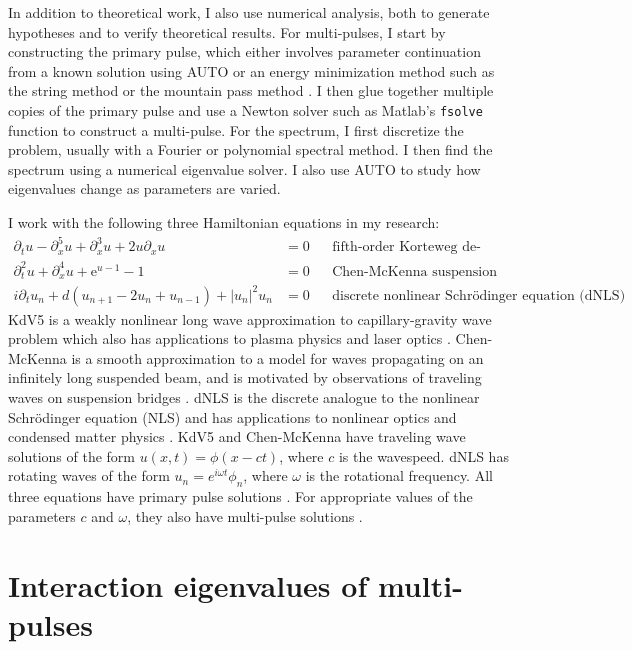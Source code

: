 \documentclass[12pt,reqno,oneside]{article}
\theoremstyle{definition}
\theoremstyle{remark}
\begin{document}
In addition to theoretical work, I also use numerical analysis, both to generate hypotheses and to verify theoretical results. For multi-pulses, I start by constructing the primary pulse, which either involves parameter continuation from a known solution using AUTO or an energy minimization method such as the string method \cite{Chamard2011} or the mountain pass method \cite{Chen1997}. I then glue together multiple copies of the primary pulse and use a Newton solver such as Matlab's \texttt{fsolve} function to construct a multi-pulse. For the spectrum, I first discretize the problem, usually with a Fourier or polynomial spectral method. I then find the spectrum using a numerical eigenvalue solver. I also use AUTO to study how eigenvalues change as parameters are varied.

I work with the following three Hamiltonian equations in my research:
\begin{align*}
\partial_t u - \partial_x^5 u + \partial_x^3 u + 2 u \partial_x u &= 0 && \text{fifth-order Korteweg de-Vries equation (KdV5)} \\
\partial_t^2 u + \partial_x^4 u + \mathrm{e}^{u-1} - 1 &= 0 &&\text{Chen-McKenna suspension bridge equation} \\
i\partial_t u_n + d(u_{n+1} - 2 u_n + u_{n-1}) + |u_n|^2 u_n &= 0 &&\text{discrete nonlinear Schr{\"o}dinger equation (dNLS)}
\end{align*}
KdV5 is a weakly nonlinear long wave approximation to capillary-gravity wave problem which also has applications to plasma physics and laser optics \cite{Pelinovsky2007}. Chen-McKenna is a smooth approximation to a model for waves propagating on an infinitely long suspended beam, and is motivated by observations of traveling waves on suspension bridges \cite{McKenna1990,Chen1997}. dNLS is the discrete analogue to the nonlinear Schr{\"o}dinger equation (NLS) and has applications to nonlinear optics and condensed matter physics \cite{Kevrekidis2009}. KdV5 and Chen-McKenna have traveling wave solutions of the form $u(x, t) = \phi(x - ct)$, where $c$ is the wavespeed. dNLS has rotating waves of the form $u_n = e^{i\omega t}\phi_n$, where $\omega$ is the rotational frequency.
All three equations have primary pulse solutions \cite{Pelinovsky2007,Smets2002,Berg2018,Kevrekidis2009}. For appropriate values of the parameters $c$ and $\omega$, they also have multi-pulse solutions \cite{Buffoni1996,SandstedeStrut,Kevrekidis2009}.

\section{Interaction eigenvalues of multi-pulses}
\end{document}
